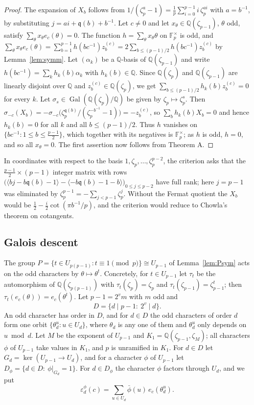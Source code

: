 \documentclass[11pt]{amsart}
\theoremstyle{definition}
\theoremstyle{remark}
\providecommand{\Q}{\mathbb Q}
\providecommand{\F}{\mathbb F}
\newcommand{\fq}{\mathfrak q}
\DeclareMathOperator{\Gal}{Gal}
\numberwithin{equation}{section}
\begin{document}
\begin{proof}
The expansion of $X_b$ follows from $1/(\zeta_p^{a}-1)=\frac1p\sum_{i=0}^{p-1}i\,\zeta_p^{ai}$ with $a=b^{-1}$, by substituting $j=a i+\fq(b)+b^{-1}$.
Let $c\ne0$ and let $x_\theta\in\Q(\zeta_{p-1})$, $\theta$ odd, satisfy $\sum_\theta x_\theta e_c(\theta)=0$.
The function $h=\sum_\theta x_\theta\theta$ on $\F_p^\times$ is odd, and $\sum_\theta x_\theta e_c(\theta)=\sum_{b=1}^{p-1}h(bc^{-1})z_b^{(c)}=2\sum_{b\le(p-1)/2}h(bc^{-1})z_b^{(c)}$ by Lemma~\ref{lem:symm}.
Let $(\alpha_k)$ be a $\Q$-basis of $\Q(\zeta_{p-1})$ and write $h(bc^{-1})=\sum_kh_k(b)\alpha_k$ with $h_k(b)\in\Q$.
Since $\Q(\zeta_p)$ and $\Q(\zeta_{p-1})$ are linearly disjoint over $\Q$ and $z_b^{(c)}\in\Q(\zeta_p)$, we get $\sum_{b\le(p-1)/2}h_k(b)z_b^{(c)}=0$ for every $k$.
Let $\sigma_s\in\Gal(\Q(\zeta_p)/\Q)$ be given by $\zeta_p\mapsto\zeta_p^s$.
Then $\sigma_{-c}(X_b)=-\sigma_{-c}\bigl(\zeta_p^{\fq(b)}/(\zeta_p^{-b^{-1}}-1)\bigr)=-z_b^{(c)}$, so $\sum_bh_k(b)X_b=0$ and hence $h_k(b)=0$ for all $k$ and all $b\le(p-1)/2$.
Thus $h$ vanishes on $\{bc^{-1}:1\le b\le\frac{p-1}2\}$, which together with its negatives is $\F_p^\times$; as $h$ is odd, $h=0$, and so all $x_\theta=0$.
The first assertion now follows from Theorem A.
\end{proof}

In coordinates with respect to the basis $1,\zeta_p,\dots,\zeta_p^{p-2}$, the criterion asks that the $\frac{p-1}2\times(p-1)$ integer matrix with rows $\bigl(\langle bj-b\fq(b)-1\rangle-\langle-b\fq(b)-1-b\rangle\bigr)_{0\le j\le p-2}$ have full rank; here $j=p-1$ was eliminated by $\zeta_p^{p-1}=-\sum_{j<p-1}\zeta_p^j$.
Without the Fermat quotient the $X_b$ would be $\frac12-\frac i2\cot(\pi b^{-1}/p)$, and the criterion would reduce to Chowla's theorem on cotangents.

\subsection{Galois descent}
The group $P=\{t\in U_{p(p-1)}:t\equiv1\pmod p\}\cong U_{p-1}$ of Lemma~\ref{lem:Psym} acts on the odd characters by $\theta\mapsto\theta^t$.
Concretely, for $t\in U_{p-1}$ let $\tau_t$ be the automorphism of $\Q(\zeta_{p(p-1)})$ with $\tau_t(\zeta_p)=\zeta_p$ and $\tau_t(\zeta_{p-1})=\zeta_{p-1}^t$; then $\tau_t(e_c(\theta))=e_c(\theta^t)$.
Let $p-1=2^vm$ with $m$ odd and
\[
D=\{d\mid p-1:\ 2^v\mid d\}.
\]
An odd character has order in $D$, and for $d\in D$ the odd characters of order $d$ form one orbit $\{\theta_d^u:u\in U_d\}$, where $\theta_d$ is any one of them and $\theta_d^u$ only depends on $u\bmod d$.
Let $M$ be the exponent of $U_{p-1}$ and $K_1=\Q(\zeta_{p-1},\zeta_M)$; all characters $\phi$ of $U_{p-1}$ take values in $K_1$, and $p$ is unramified in $K_1$.
For $d\in D$ let $G_d=\ker(U_{p-1}\to U_d)$, and for a character $\phi$ of $U_{p-1}$ let $D_\phi=\{d\in D:\ \phi|_{G_d}=1\}$.
For $d\in D_\phi$ the character $\phi$ factors through $U_d$, and we put
\[
\varepsilon^{\phi}_d(c)=\sum_{u\in U_d}\bar\phi(u)\,e_c(\theta_d^u).
\]
\end{document}
